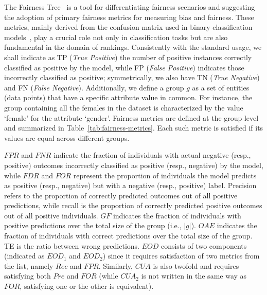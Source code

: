 The Fairness Tree~\cite{baresi2023understanding, saleiro2020dealing}
is a tool for differentiating fairness scenarios and suggesting the adoption of primary fairness metrics for measuring bias and fairness. These metrics, mainly derived from the confusion matrix used in binary classification models~\cite{evaluation2008},
play a crucial role not only in classification tasks but are also fundamental in the domain of rankings.
Consistently with the standard usage, we shall indicate as TP (\emph{True Positive}) the number of positive instances correctly classified as positive by the model, while FP (\emph{False Positive}) indicates those incorrectly classified as positive; symmetrically, we also have TN (\emph{True Negative}) and FN (\emph{False Negative}). 
Additionally, we define a group $g$ as a set of entities (data points) that have a specific attribute value in common. For instance, the group containing all the females in the dataset is characterized by the value `female' for the attribute `gender'. Fairness metrics are defined at the group level and summarized in Table~\ref{tab:fairness-metrics}.
Each such metric is satisfied if its values are equal across different groups.

$FPR$ and $FNR$ indicate the fraction of individuals with actual negative (resp., positive) outcomes incorrectly classified as positive (resp., negative) by the model, while $FDR$ and $FOR$ represent the proportion of individuals the model predicts as positive (resp., negative) but with a negative (resp., positive) label. Precision refers to the proportion of correctly predicted outcomes out of all positive predictions, while recall is the proportion of correctly predicted positive outcomes out of all positive individuals. $GF$ indicates the fraction of individuals with positive predictions over the total size of the group (i.e., $|g|$). $OAE$ indicates the fraction of individuals with correct predictions over the total size of the group. TE is the ratio between wrong predictions.
$EOD$ consists of two components (indicated as $EOD_1$ and $EOD_2$) since it requires satisfaction of two metrics from the list, namely $Rec$ and $FPR$. Similarly, $CUA$ is also twofold and requires satisfying both $Pre$ and $FOR$ (while $CUA_2$ is not written in the same way as $FOR$, satisfying one or the other is equivalent).


